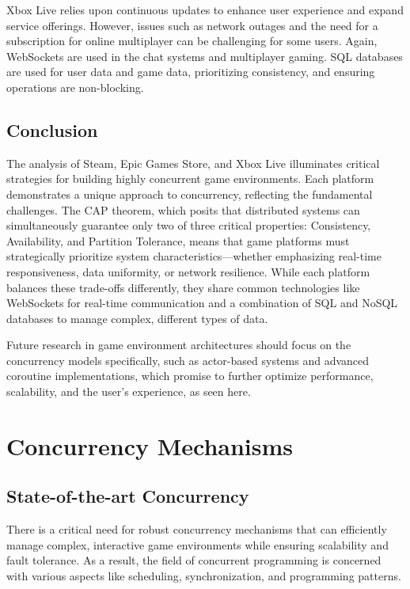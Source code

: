 \documentclass[]{project_interim}
\begin{document}
Xbox Live relies upon continuous updates to enhance user experience and
expand service offerings. However, issues such as network outages and the need
for a subscription for online multiplayer can be challenging for some users.
Again, WebSockets are used in the chat systems and multiplayer gaming.
SQL databases are used for user data and game data, prioritizing consistency,
and ensuring operations are non-blocking.\cite{woolsey_how_2024}


\section{Conclusion}

The analysis of Steam, Epic Games Store, and Xbox Live illuminates
critical strategies for building highly concurrent game environments. Each platform
demonstrates a unique approach to concurrency, reflecting the fundamental challenges.
The CAP theorem, which posits that distributed systems can
simultaneously guarantee only two of three critical properties: Consistency,
Availability, and Partition Tolerance, means that game platforms must
strategically prioritize system characteristics—whether emphasizing real-time
responsiveness, data uniformity, or network resilience.
\cite{gilbert_perspectives_2012} While each platform balances these
trade-offs differently, they share common technologies like WebSockets for real-time
communication and a combination of SQL and NoSQL databases to manage complex,
different types of data.

Future research in game environment architectures should focus
on the concurrency models specifically, such as actor-based systems and advanced coroutine
implementations, which promise to further optimize performance, scalability,
and the user's experience, as seen here.

\chapter{Concurrency Mechanisms}
\section{State-of-the-art Concurrency}

There is a critical need for robust concurrency mechanisms that can efficiently
manage complex, interactive game environments while ensuring scalability
and fault tolerance. As a result, the field of concurrent programming is concerned
with various aspects like scheduling, synchronization, and programming patterns.
\end{document}
